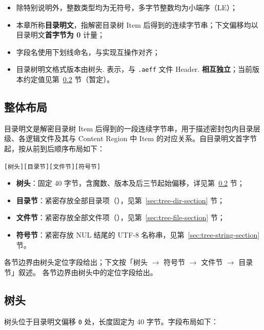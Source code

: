 \begin{itemize}
  \item 除特别说明外，整数类型均为无符号，多字节整数均为小端序（LE）；
  \item 本章所称\textbf{目录明文}，指解密目录树 Item 后得到的连续字节串；下文偏移均以目录明文\textbf{首字节为 0} 计量；
  \item 字段名使用下划线命名，与实现互操作对齐；
  \item 目录树明文格式版本由树头. 表示，与 \texttt{.aeff} 文件 Header. \textbf{相互独立}；当前版本约定值见第~\ref{sec:tree-header} 节（暂定）。
\end{itemize}

\subsection{整体布局}\label{sec:tree-file-layout}

目录明文是解密目录树 Item 后得到的一段连续字节串，用于描述密封包内目录层级、各逻辑文件及其与 Content Region 中 Item 的对应关系。自目录明文首字节起，按从前到后顺序布局如下：
\begin{center}
  \texttt{[树头][目录节][文件节][符号节]}
\end{center}
\begin{itemize}
  \item \textbf{树头}：固定 40 字节，含魔数、版本及后三节起始偏移，详见第~\ref{sec:tree-header} 节；
  \item \textbf{目录节}：紧密存放全部目录项（），见第~\ref{sec:tree-dir-section} 节；
  \item \textbf{文件节}：紧密存放全部文件项（），见第~\ref{sec:tree-file-section} 节；
  \item \textbf{符号节}：紧密存放 NUL 结尾的 UTF-8 名称串，见第~\ref{sec:tree-string-section} 节。
\end{itemize}
各节边界由树头定位字段给出；下文按「树头 $\rightarrow$ 符号节 $\rightarrow$ 文件节 $\rightarrow$ 目录节」叙述。
各节边界由树头中的定位字段给出。

\subsection{树头}\label{sec:tree-header}

树头位于目录明文偏移 \texttt{0} 处，长度固定为 40 字节。字段布局如下：

